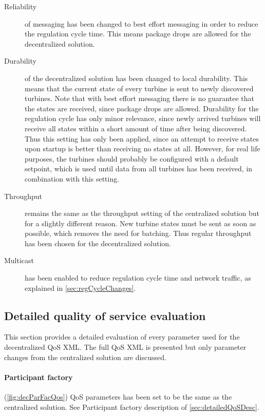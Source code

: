 \begin{description}
	\item[Reliability] of messaging has been changed to best effort messaging in order to reduce the regulation cycle time. This means package drops are allowed for the decentralized solution.
	\item[Durability] of the decentralized solution has been changed to local durability. This means that the current state of every turbine is sent to newly discovered turbines. Note that with best effort messaging there is no guarantee that the states are received, since package drops are allowed. Durability for the regulation cycle has only minor relevance, since newly arrived turbines will receive all states within a short amount of time after being discovered. Thus this setting has only been applied, since an attempt to receive states upon startup is better than receiving no states at all. However, for real life purposes, the turbines should probably be configured with a default setpoint, which is used until data from all turbines has been received, in combination with this setting. 
	\item[Throughput] remains the same as the throughput setting of the centralized solution but for a slightly different reason. New turbine states must be sent as soon as possible, which removes the need for batching. Thus regular throughput has been chosen for the decentralized solution. 
	\item[Multicast] has been enabled to reduce regulation cycle time and network traffic, as explained in \cref{sec:regCycleChanges}.
\end{description}

\subsection{Detailed quality of service evaluation}

This section provides a detailed evaluation of every parameter used for the decentralized QoS XML. The full QoS XML is presented but only parameter changes from the centralized solution are discussed.

\paragraph{Participant factory} (\cref{fig:decParFacQos}) QoS parameters has been set to be the same as the centralized solution. See Participant factory description of \cref{sec:detailedQoSDesc}.

